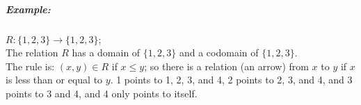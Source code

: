 \documentclass[a4paper,12pt]{book}
\newcounter{question}
\begin{document}
{\begin{introNOHEAD}{}
            \subparagraph{Example:}
            $R : \{1,2,3\} \to \{1,2,3\}$; \\

            The relation $R$ has a domain of $\{1,2,3\}$ and a
            codomain of $\{1, 2, 3\}$. \\

            The rule is: $(x,y) \in R$ if $x \leq y$;
            so there is a relation (an arrow) from $x$ to $y$ if
            $x$ is less than or equal to $y$. 1 points to 1, 2, 3, and 4,
            2 points to 2, 3, and 4, and 3 points to 3 and 4, and 4 only points to itself.
        \end{introNOHEAD}
    }{}


\end{document}

